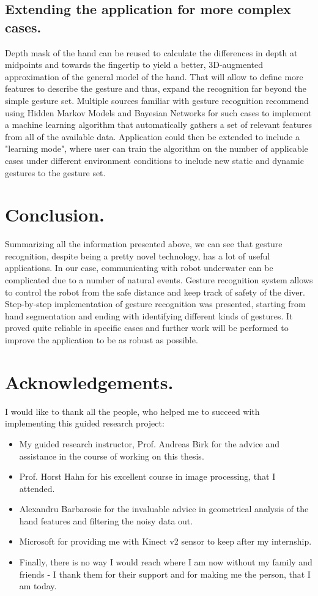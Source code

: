 \documentclass[a4paper,11pt,oneside]{article}
\begin{document}
\subsection{Extending the application for more complex cases.}

Depth mask of the hand can be reused to calculate the differences in depth at midpoints and towards the fingertip to yield a better, 3D-augmented approximation of the general model of the hand. That will allow to define more features to describe the gesture and thus, expand the recognition far beyond the simple gesture set. Multiple sources familiar with gesture recognition recommend using Hidden Markov Models and Bayesian Networks \cite{ZG01} for such cases to implement a machine learning algorithm that automatically gathers a set of relevant features from all of the available data. Application could then be extended to include a "learning mode", where user can train the algorithm on the number of applicable cases under different environment conditions to include new static and dynamic gestures to the gesture set.

\section{Conclusion.}

Summarizing all the information presented above, we can see that gesture recognition, despite being a pretty novel technology, has a lot of useful applications. In our case, communicating with robot underwater can be complicated due to a number of natural events. Gesture recognition system allows to control the robot from the safe distance and keep track of safety of the diver. Step-by-step implementation of gesture recognition was presented, starting from hand segmentation and ending with identifying different kinds of gestures. It proved quite reliable in specific cases and further work will be performed to improve the application to be as robust as possible.  

\section{Acknowledgements.}
I would like to thank all the people, who helped me to succeed with implementing this guided research project:

\begin{itemize}
\item My guided research instructor, Prof. Andreas Birk for the advice and assistance in the course of working on this thesis.
\item Prof. Horst Hahn for his excellent course in image processing, that I attended.
\item Alexandru Barbarosie for the invaluable advice in geometrical analysis of the hand features and filtering the noisy data out. 
\item Microsoft for providing me with Kinect v2 sensor to keep after my internship. 
\item Finally, there is no way I would reach where I am now without my family and friends - I thank them for their support and for making me the person, that I am today.
\end{itemize}
\end{document}
